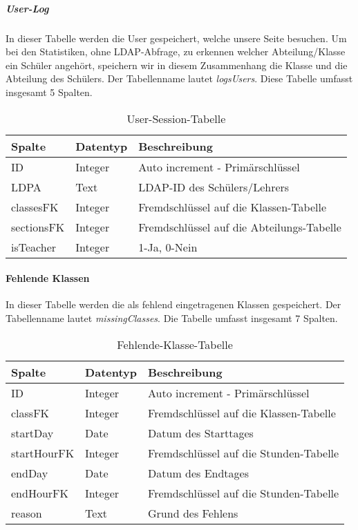 \subparagraph{User-Log\\}
In dieser Tabelle werden die User gespeichert, welche unsere Seite besuchen. Um bei den Statistiken, ohne LDAP-Abfrage, zu erkennen welcher Abteilung/Klasse ein Schüler angehört, speichern wir in diesem Zusammenhang die Klasse und die Abteilung des Schülers. Der Tabellenname lautet \textit{logsUsers}. Diese Tabelle umfasst insgesamt 5 Spalten. 

\begin{table}[H]
\centering
\begin{tabular}{p{2.5 cm}p{2.5 cm}p{10 cm}}
   \toprule
   \textbf{Spalte} & \textbf{Datentyp} & \textbf{Beschreibung} \\
   \midrule
          ID & Integer & Auto increment - Primärschlüssel  \\
          \hline
          LDPA & Text & LDAP-ID des Schülers/Lehrers   \\
          \hline
	      classesFK & Integer & Fremdschlüssel auf die Klassen-Tabelle   \\
	      \hline
          sectionsFK & Integer & Fremdschlüssel auf die Abteilungs-Tabelle   \\
          \hline
          isTeacher & Integer & 1-Ja, 0-Nein  \\
   \bottomrule
\end{tabular}
\caption{User-Session-Tabelle}
\end{table}

\paragraph{Fehlende Klassen\\}
In dieser Tabelle werden die als fehlend eingetragenen Klassen gespeichert. Der Tabellenname lautet \textit{missingClasses}. Die Tabelle umfasst insgesamt 7 Spalten.

\begin{table}[H]
\centering
\begin{tabular}{p{2.5 cm}p{2.5 cm}p{10 cm}}
   \toprule
   \textbf{Spalte} & \textbf{Datentyp} & \textbf{Beschreibung} \\
   \midrule
          ID & Integer & Auto increment - Primärschlüssel  \\
          \hline
          classFK & Integer & Fremdschlüssel auf die Klassen-Tabelle   \\
          \hline
	      startDay & Date & Datum des Starttages   \\
	      \hline
          startHourFK & Integer & Fremdschlüssel auf die Stunden-Tabelle   \\
          \hline
          endDay & Date & Datum des Endtages   \\
          \hline
          endHourFK & Integer & Fremdschlüssel auf die Stunden-Tabelle   \\
          \hline
          reason & Text & Grund des Fehlens  \\
   \bottomrule
\end{tabular}
\caption{Fehlende-Klasse-Tabelle}
\end{table}

